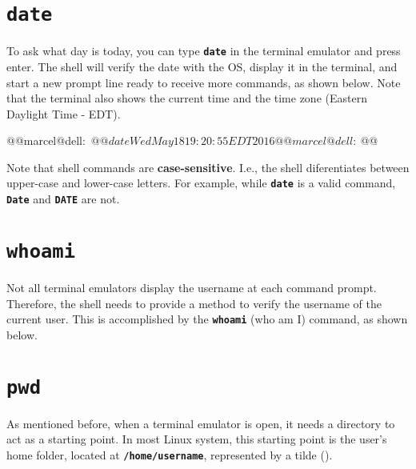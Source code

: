 \section{\textbf{\texttt{date}}}
To ask what day is today, you can type \textbf{\texttt{date}}  in the terminal emulator and press enter. The shell will verify the date with the \acs{OS}, display it in the terminal, and start a new prompt line ready to receive more commands, as shown below. Note that the terminal also shows the current time and the time zone (Eastern Daylight Time - EDT).

\begin{command_line}[Bash]
@@marcel@dell:~$@@ date
Wed May 18 19:20:55 EDT 2016
@@marcel@dell:~$@@
\end{command_line}

Note that shell commands are \textbf{case-sensitive}. I.e., the shell diferentiates between upper-case and lower-case letters. For example, while \textbf{\texttt{date}} is a valid command, \textbf{\texttt{Date}} and \textbf{\texttt{DATE}} are not.

\section{\textbf{\texttt{whoami}}}
Not all terminal emulators display the username at each command prompt. Therefore, the shell needs to provide a method to verify the username of the current user. This is accomplished by the \textbf{\texttt{whoami}} (who am I) command, as shown below.


\section{\textbf{\texttt{pwd}}}

As mentioned before, when a terminal emulator is open, it needs a directory to act as a starting point. In most Linux system, this starting point is the user's home folder, located at \textbf{\texttt{/home/username}}, represented by a tilde (\textbf{\texttt{\texttildelow}}).

